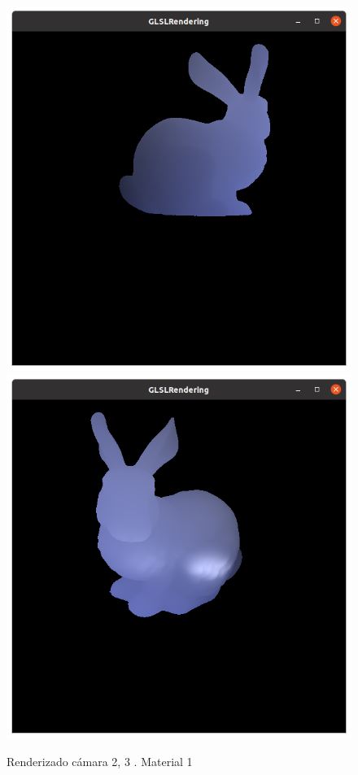 \documentclass[12pt]{article}
\begin{document}
\begin{figure}[H]
\centering
\includegraphics[scale=0.3]{images/ej3.png}
\includegraphics[scale=0.3]{images/ej4.png}
\caption{Renderizado cámara 2, 3 . Material 1}
\end{figure}




\end{document}
